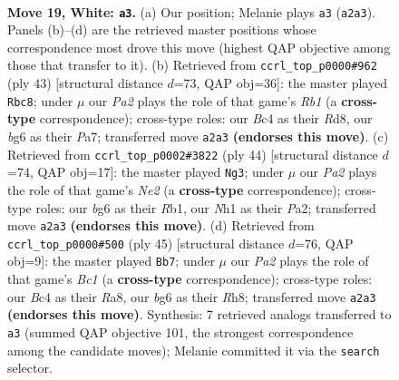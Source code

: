 \documentclass[11pt]{article}
\begin{document}
\clearpage

\begin{figure}[p]\centering
\begin{subfigure}{0.46\textwidth}\centering
\resizebox{\linewidth}{!}{%
\newchessgame
\chessboard[
  setfen={r3kbnr/2n3p1/6b1/p6p/2B1pP1P/4R3/PP1K2P1/R5NN w kq - 0 19},
  showmover=false,
  pgfstyle=straightmove, color=movearrow, markmove={a2-a3}
]}
\caption{}
\end{subfigure}\hfill
\begin{subfigure}{0.46\textwidth}\centering
\resizebox{\linewidth}{!}{%
\newchessgame
\chessboard[
  setfen={1r1r2k1/p4p1p/2b3n1/4p3/2B1P3/2P3P1/P2N3P/R3K2R b KQ - 2 22},
  showmover=false,
  pgfstyle=straightmove, color=movearrow, markmove={b8-c8}
]}
\caption{}
\end{subfigure}
\\[4pt]
\begin{subfigure}{0.46\textwidth}\centering
\resizebox{\linewidth}{!}{%
\newchessgame
\chessboard[
  setfen={1r1r2k1/1B1b1p2/p3pb1B/4n3/2P5/7P/P3NP1K/1R3R2 w - - 1 23},
  showmover=false,
  pgfstyle=straightmove, color=movearrow, markmove={e2-g3}
]}
\caption{}
\end{subfigure}\hfill
\begin{subfigure}{0.46\textwidth}\centering
\resizebox{\linewidth}{!}{%
\newchessgame
\chessboard[
  setfen={r1b1k2r/5p2/1p6/4p1Pp/3nP2P/8/PP6/R1BBK2R b KQkq - 0 23},
  showmover=false,
  pgfstyle=straightmove, color=movearrow, markmove={c8-b7}
]}
\caption{}
\end{subfigure}
\caption{\textbf{Move 19, White: \texttt{a3}.} (a) Our position; Melanie plays \texttt{a3} (\texttt{a2a3}). Panels (b)--(d) are the retrieved master positions whose correspondence most drove this move (highest QAP objective among those that transfer to it). (b) Retrieved from \texttt{ccrl\_top\_p0000\#962} (ply 43) [structural distance $d$=73, QAP obj=36]: the master played \texttt{Rbc8}; under $\mu$ our \emph{Pa2} plays the role of that game's \emph{Rb1} (a \textbf{cross-type} correspondence); cross-type roles: our \emph{B}c4 as their \emph{R}d8, our \emph{b}g6 as their \emph{P}a7; transferred move \texttt{a2a3} \textbf{(endorses this move)}. (c) Retrieved from \texttt{ccrl\_top\_p0002\#3822} (ply 44) [structural distance $d$=74, QAP obj=17]: the master played \texttt{Ng3}; under $\mu$ our \emph{Pa2} plays the role of that game's \emph{Ne2} (a \textbf{cross-type} correspondence); cross-type roles: our \emph{b}g6 as their \emph{R}b1, our \emph{N}h1 as their \emph{P}a2; transferred move \texttt{a2a3} \textbf{(endorses this move)}. (d) Retrieved from \texttt{ccrl\_top\_p0000\#500} (ply 45) [structural distance $d$=76, QAP obj=9]: the master played \texttt{Bb7}; under $\mu$ our \emph{Pa2} plays the role of that game's \emph{Bc1} (a \textbf{cross-type} correspondence); cross-type roles: our \emph{B}c4 as their \emph{R}a8, our \emph{b}g6 as their \emph{R}h8; transferred move \texttt{a2a3} \textbf{(endorses this move)}. Synthesis: 7 retrieved analogs transferred to \texttt{a3} (summed QAP objective 101, the strongest correspondence among the candidate moves); Melanie committed it via the \texttt{search} selector.}
\label{fig:thought-m36}
\end{figure}
\end{document}
